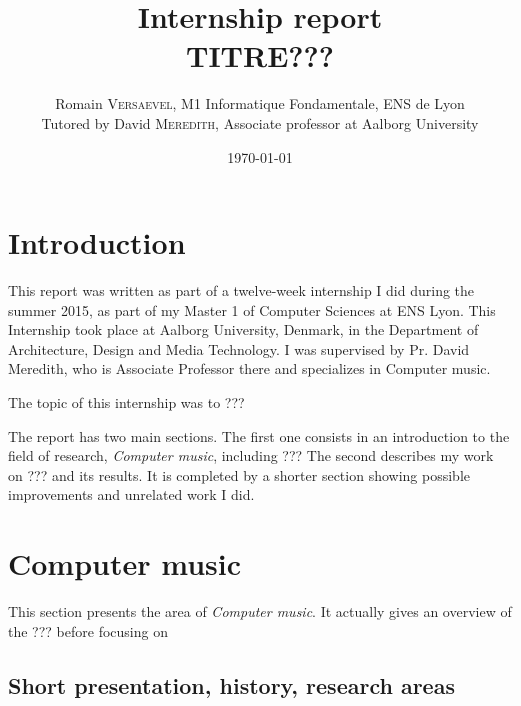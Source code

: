 \documentclass[a4paper,10pt]{article}
\title{ \Large Internship report \\ \LARGE TITRE???}
\author{\normalsize Romain \textsc{Versaevel}, M1 Informatique Fondamentale, ENS de Lyon \\ \normalsize Tutored by David \textsc{Meredith}, Associate professor at Aalborg University\\}
\date{\today}
\begin{document}
\maketitle

\begin{abstract}
\end{abstract}

\newpage
\tableofcontents
\newpage


\section{Introduction}

This report was written as part of a twelve-week internship I did during the summer 2015, as part of my Master 1 of Computer Sciences at ENS Lyon. This Internship took place at Aalborg University, Denmark, in the Department of Architecture, Design and Media Technology. I was supervised by Pr. David Meredith, who is Associate Professor there and specializes in Computer music.

The topic of this internship was to ???



The report has two main sections. The first one consists in an introduction to the field of research, \emph{Computer music}, including ???
The second describes my work on ??? and its results. It is completed by a shorter section showing possible improvements and unrelated work I did.

\section{Computer music}

This section presents the area of \emph{Computer music}. It actually gives an overview of the ???
before focusing on 


\subsection{Short presentation, history, research areas}
\end{document}
